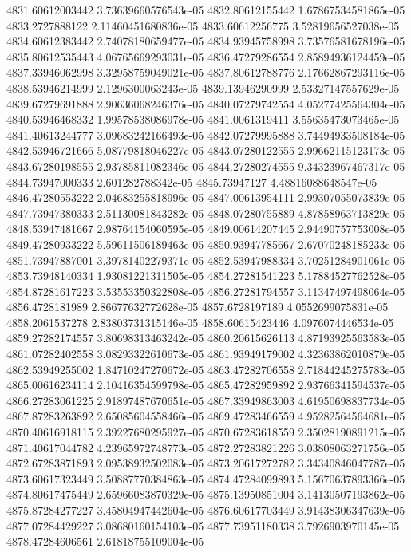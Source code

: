{4831.60612003442 3.73639660576543e-05
4832.80612155442 1.67867534581865e-05
4833.2727888122 2.11460451680836e-05
4833.60612256775 3.52819656527038e-05
4834.60612383442 2.74078180659477e-05
4834.93945758998 3.73576581678196e-05
4835.80612535443 4.06765669293031e-05
4836.47279286554 2.85894936124459e-05
4837.33946062998 3.32958759049021e-05
4837.80612788776 2.17662867293116e-05
4838.53946214999 2.1296300063243e-05
4839.13946290999 2.53327147557629e-05
4839.67279691888 2.90636068246376e-05
4840.07279742554 4.05277425564304e-05
4840.53946468332 1.99578538086978e-05
4841.0061319411 3.55635473073465e-05
4841.40613244777 3.09683242166493e-05
4842.07279995888 3.74494933508184e-05
4842.53946721666 5.08779818046227e-05
4843.07280122555 2.99662115123173e-05
4843.67280198555 2.93785811082346e-05
4844.27280274555 9.34323967467317e-05
4844.73947000333 2.601282788342e-05
4845.73947127 4.48816088648547e-05
4846.47280553222 2.04683255818996e-05
4847.00613954111 2.99307055073839e-05
4847.73947380333 2.51130081843282e-05
4848.07280755889 4.87858963713829e-05
4848.53947481667 2.98764154060595e-05
4849.00614207445 2.94490757753008e-05
4849.47280933222 5.59611506189463e-05
4850.93947785667 2.67070248185233e-05
4851.73947887001 3.39781402279371e-05
4852.53947988334 3.70251284901061e-05
4853.73948140334 1.93081221311505e-05
4854.27281541223 5.17884527762528e-05
4854.87281617223 3.53553350322808e-05
4856.27281794557 3.11347497498064e-05
4856.4728181989 2.86677632772628e-05
4857.6728197189 4.0552699075831e-05
4858.2061537278 2.83803731315146e-05
4858.60615423446 4.0976074446534e-05
4859.27282174557 3.80698313463242e-05
4860.20615626113 4.87193925563583e-05
4861.07282402558 3.08293322610673e-05
4861.93949179002 4.32363862010879e-05
4862.53949255002 1.84710247270672e-05
4863.47282706558 2.71844245275783e-05
4865.00616234114 2.10416354599798e-05
4865.47282959892 2.93766341594537e-05
4866.27283061225 2.91897487670651e-05
4867.33949863003 4.61950698837734e-05
4867.87283263892 2.65085604558466e-05
4869.47283466559 4.95282564564681e-05
4870.40616918115 2.39227680295927e-05
4870.67283618559 2.35028190891215e-05
4871.40617044782 4.23965972748773e-05
4872.27283821226 3.03808063271756e-05
4872.67283871893 2.09538932502083e-05
4873.20617272782 3.34340846047787e-05
4873.60617323449 3.50887770384863e-05
4874.47284099893 5.15670637893366e-05
4874.80617475449 2.65966083870329e-05
4875.13950851004 3.14130507193862e-05
4875.87284277227 3.45804947442604e-05
4876.60617703449 3.91438306347639e-05
4877.07284429227 3.08680160154103e-05
4877.73951180338 3.7926903970145e-05
4878.47284606561 2.61818755109004e-05
}
